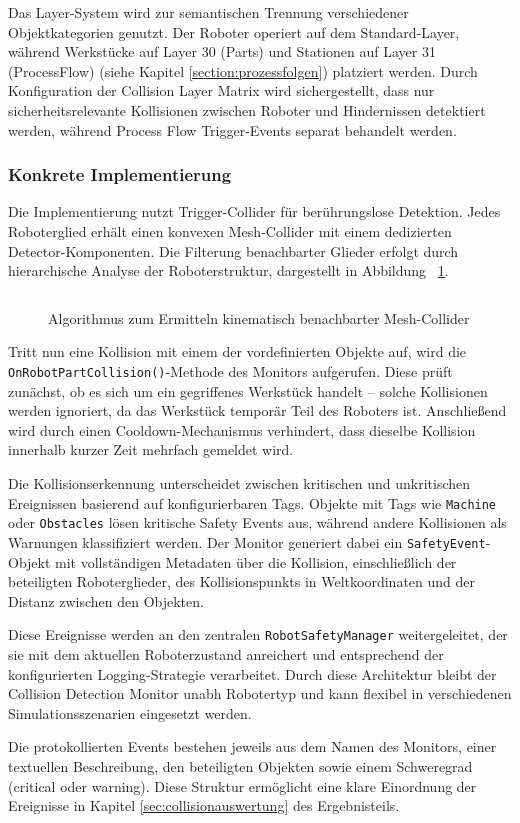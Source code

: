 Das Layer-System wird zur semantischen Trennung verschiedener Objektkategorien
genutzt. Der Roboter operiert auf dem Standard-Layer, während Werkstücke auf
Layer 30 (Parts) und Stationen auf Layer 31 (ProcessFlow) (siehe Kapitel
\ref{section:prozessfolgen}) platziert werden.
Durch Konfiguration der Collision Layer Matrix wird sichergestellt, dass nur
sicherheitsrelevante Kollisionen zwischen Roboter und Hindernissen detektiert
werden, während Process Flow Trigger-Events separat behandelt werden.

\subsubsection{Konkrete Implementierung}
Die Implementierung nutzt Trigger-Collider für berührungslose Detektion. Jedes
Roboterglied erhält einen konvexen Mesh-Collider mit einem dedizierten
Detector-Komponenten. Die Filterung benachbarter Glieder erfolgt
durch hierarchische Analyse der
Roboterstruktur, dargestellt in Abbildung~ \ref{listing:adjacentFrames}.

\begin{figure}[H]
  \inputminted[fontsize=\footnotesize]{csharp}{code-snippets/SetupAdjacentFramesIgnoring.cs}
  \caption{Algorithmus zum Ermitteln kinematisch benachbarter Mesh-Collider}
  \label{listing:adjacentFrames}
\end{figure}

Tritt nun eine Kollision mit einem der vordefinierten Objekte auf, wird die
\texttt{OnRobotPartCollision()}-Methode des Monitors aufgerufen. Diese prüft
zunächst, ob es sich um ein gegriffenes Werkstück handelt – solche Kollisionen
werden ignoriert, da das Werkstück temporär Teil des Roboters ist. Anschließend
wird durch einen Cooldown-Mechanismus verhindert, dass dieselbe Kollision
innerhalb kurzer Zeit mehrfach gemeldet wird.

Die Kollisionserkennung unterscheidet zwischen kritischen und unkritischen
Ereignissen basierend auf konfigurierbaren Tags. Objekte mit Tags wie
\texttt{Machine} oder \texttt{Obstacles} lösen kritische Safety Events aus,
während andere Kollisionen als Warnungen klassifiziert werden. Der Monitor
generiert dabei ein \texttt{SafetyEvent}-Objekt mit vollständigen Metadaten
über die Kollision, einschließlich der beteiligten Roboterglieder, des
Kollisionspunkts in Weltkoordinaten und der Distanz zwischen den Objekten.

Diese Ereignisse werden an den zentralen \texttt{RobotSafetyManager}
weitergeleitet, der sie mit dem aktuellen Roboterzustand anreichert und
entsprechend der konfigurierten Logging-Strategie verarbeitet. Durch diese
Architektur bleibt der Collision Detection Monitor unabh
Robotertyp und kann flexibel in verschiedenen Simulationsszenarien eingesetzt
werden.

Die protokollierten Events bestehen jeweils aus dem Namen des Monitors,
einer textuellen Beschreibung, den beteiligten Objekten sowie einem
Schweregrad (critical oder warning). Diese Struktur ermöglicht eine
klare Einordnung der Ereignisse in Kapitel
\ref{sec:collisionauswertung} des Ergebnisteils.
